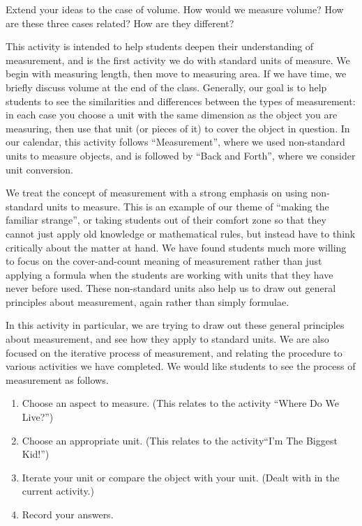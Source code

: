 \documentclass[nooutcomes]{ximera}
\begin{document}
\begin{problem}
Extend your ideas to the case of volume.  How would we measure volume?  How are these three cases related?  How are they different?
\end{problem}


\newpage
\begin{instructorNotes}
This activity is intended to help students deepen their understanding of measurement, and is the first activity we do with standard units of measure.  We begin with measuring length, then move to measuring area.  If we have time, we briefly discuss volume at the end of the class.  Generally, our goal is to help students to see the similarities and differences between the types of measurement: in each case you choose a unit with the same dimension as the object you are measuring, then use that unit (or pieces of it) to cover the object in question.  In our calendar, this activity follows ``Measurement'', where we used non-standard units to measure objects, and is followed by ``Back and Forth'', where we consider unit conversion.

We treat the concept of measurement with a strong emphasis on using non-standard units to measure.  This is an example of our theme of ``making the familiar strange'', or taking students out of their comfort zone so that they cannot just apply old knowledge or mathematical rules, but instead have to think critically about the matter at hand.  We have found students much more willing to focus on the cover-and-count meaning of measurement rather than just applying a formula when the students are working with units that they have never before used.  These non-standard units also help us to draw out general principles about measurement, again rather than simply formulae.

In this activity in particular, we are trying to draw out these general principles about measurement, and see how they apply to standard units.  We are also focused on the iterative process of measurement, and relating the procedure to various activities we have completed.  We would like students to see the process of measurement as follows.
\begin{enumerate}
    \item Choose an aspect to measure. (This relates to the activity ``Where Do We Live?'')
    \item Choose an appropriate unit.  (This relates to  the activity``I'm The Biggest Kid!'')
    \item Iterate your unit or compare the object with your unit.  (Dealt with in the current activity.)
    \item Record your answers.
\end{enumerate}


\end{instructorNotes}
\end{document}
